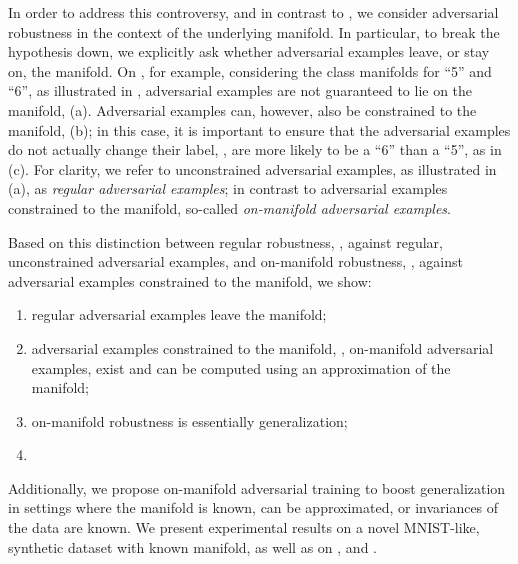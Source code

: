 In order to address this controversy, and in contrast to \cite{TsiprasARXIV2018,SuARXV2017,RozsaICMLA2016}, we consider adversarial robustness in the context of the underlying manifold. In particular, to break the hypothesis down, we explicitly ask whether adversarial examples leave, or stay on, the manifold. On \MNIST, for example, considering the class manifolds for ``5'' and ``6'', as illustrated in , adversarial examples are not guaranteed to lie on the manifold, \cf {} (a). Adversarial examples can, however, also be constrained to the manifold, \cf {} (b); in this case, it is important to ensure that the adversarial examples do not actually change their label, \ie, are more likely to be a ``6'' than a ``5'', as in  (c). For clarity, we refer to unconstrained adversarial examples, as illustrated in  (a), as \emph{regular adversarial examples}; in contrast to adversarial examples constrained to the manifold, so-called \emph{on-manifold adversarial examples}.

 Based on this distinction between regular robustness, \ie, against regular, unconstrained adversarial examples, and on-manifold robustness, \ie, against adversarial examples constrained to the manifold, we show:
\begin{enumerate}[itemsep=0ex,topsep=2px,parsep=2px]
    \item regular adversarial examples leave the manifold;
    \item adversarial examples constrained to the manifold, \ie, on-manifold adversarial examples, exist and can be computed using an approximation of the manifold;
    \item on-manifold robustness is essentially generalization;
    \item {}
\end{enumerate}
\noindent {} Additionally, we propose on-manifold adversarial training to boost generalization in settings where the manifold is known, can be approximated, or invariances of the data are known. We present experimental results on a novel MNIST-like, synthetic dataset with known manifold, as well as on \MNIST \cite{CohenARXIV2017}, \FashionMNIST \cite{XiaoARXIV2017} and \Celeb \cite{LiuICCV2015}. 